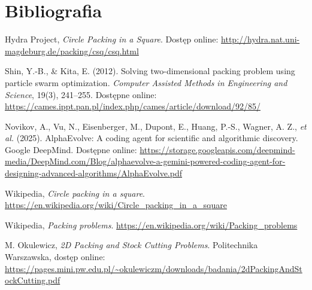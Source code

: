 \documentclass{article}
\begin{document}
\section{Bibliografia}
\renewcommand{\refname}{}
\begin{thebibliography}{9}
Hydra Project, \emph{Circle Packing in a Square}. Dostęp online: \url{http://hydra.nat.uni-magdeburg.de/packing/csq/csq.html}


Shin, Y.-B., \& Kita, E. (2012). Solving two-dimensional packing problem using particle swarm optimization. \textit{Computer Assisted Methods in Engineering and Science}, 19(3), 241–255. Dostępne online: \url{https://cames.ippt.pan.pl/index.php/cames/article/download/92/85/}

Novikov, A., Vu, N., Eisenberger, M., Dupont, E., Huang, P.-S., Wagner, A. Z., \textit{et al.} (2025). AlphaEvolve: A coding agent for scientific and algorithmic discovery. Google DeepMind. Dostępne online: \url{https://storage.googleapis.com/deepmind-media/DeepMind.com/Blog/alphaevolve-a-gemini-powered-coding-agent-for-designing-advanced-algorithms/AlphaEvolve.pdf}


Wikipedia, \emph{Circle packing in a square}. \url{https://en.wikipedia.org/wiki/Circle_packing_in_a_square} 

Wikipedia, \emph{Packing problems}. \url{https://en.wikipedia.org/wiki/Packing_problems} 

M. Okulewicz, \emph{2D Packing and Stock Cutting Problems}. Politechnika Warszawska, dostęp online: \url{https://pages.mini.pw.edu.pl/~okulewiczm/downloads/badania/2dPackingAndStockCutting.pdf} 



\end{thebibliography}
\end{document}
